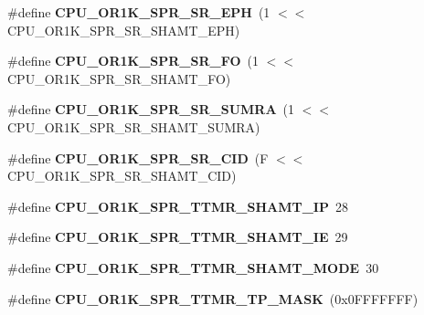 \begin{DoxyCompactItemize}
\#define {\bfseries C\+P\+U\+\_\+\+O\+R1\+K\+\_\+\+S\+P\+R\+\_\+\+S\+R\+\_\+\+E\+PH}~(1 $<$$<$ C\+P\+U\+\_\+\+O\+R1\+K\+\_\+\+S\+P\+R\+\_\+\+S\+R\+\_\+\+S\+H\+A\+M\+T\+\_\+\+E\+PH)
\item 
\mbox{\label{or1k-utility_8h_a35e5c2f5d80a0240b9d07ef623dd27f2}} 
\#define {\bfseries C\+P\+U\+\_\+\+O\+R1\+K\+\_\+\+S\+P\+R\+\_\+\+S\+R\+\_\+\+FO}~(1 $<$$<$ C\+P\+U\+\_\+\+O\+R1\+K\+\_\+\+S\+P\+R\+\_\+\+S\+R\+\_\+\+S\+H\+A\+M\+T\+\_\+\+FO)
\item 
\mbox{\label{or1k-utility_8h_ac7e836dea084ec6a1516c479523f6367}} 
\#define {\bfseries C\+P\+U\+\_\+\+O\+R1\+K\+\_\+\+S\+P\+R\+\_\+\+S\+R\+\_\+\+S\+U\+M\+RA}~(1 $<$$<$ C\+P\+U\+\_\+\+O\+R1\+K\+\_\+\+S\+P\+R\+\_\+\+S\+R\+\_\+\+S\+H\+A\+M\+T\+\_\+\+S\+U\+M\+RA)
\item 
\mbox{\label{or1k-utility_8h_afef9536a8816c1b2859a401a00c93a9e}} 
\#define {\bfseries C\+P\+U\+\_\+\+O\+R1\+K\+\_\+\+S\+P\+R\+\_\+\+S\+R\+\_\+\+C\+ID}~(F $<$$<$ C\+P\+U\+\_\+\+O\+R1\+K\+\_\+\+S\+P\+R\+\_\+\+S\+R\+\_\+\+S\+H\+A\+M\+T\+\_\+\+C\+ID)
\item 
\mbox{\label{or1k-utility_8h_ad5733942d5a30d04fcebd62b385456ee}} 
\#define {\bfseries C\+P\+U\+\_\+\+O\+R1\+K\+\_\+\+S\+P\+R\+\_\+\+T\+T\+M\+R\+\_\+\+S\+H\+A\+M\+T\+\_\+\+IP}~28
\item 
\mbox{\label{or1k-utility_8h_a50bb6e8c73fd842432a2b95438932b25}} 
\#define {\bfseries C\+P\+U\+\_\+\+O\+R1\+K\+\_\+\+S\+P\+R\+\_\+\+T\+T\+M\+R\+\_\+\+S\+H\+A\+M\+T\+\_\+\+IE}~29
\item 
\mbox{\label{or1k-utility_8h_a569f339fafe41462133feb08ebafe17b}} 
\#define {\bfseries C\+P\+U\+\_\+\+O\+R1\+K\+\_\+\+S\+P\+R\+\_\+\+T\+T\+M\+R\+\_\+\+S\+H\+A\+M\+T\+\_\+\+M\+O\+DE}~30
\item 
\mbox{\label{or1k-utility_8h_a03a0b7555d1ebbf2c12926a2d575abcd}} 
\#define {\bfseries C\+P\+U\+\_\+\+O\+R1\+K\+\_\+\+S\+P\+R\+\_\+\+T\+T\+M\+R\+\_\+\+T\+P\+\_\+\+M\+A\+SK}~(0x0\+F\+F\+F\+F\+F\+F\+F)
\item 
\mbox{\label{or1k-utility_8h_a2cda64e0d0ee4591050b6da748af240d}} 

\end{DoxyCompactItemize}
